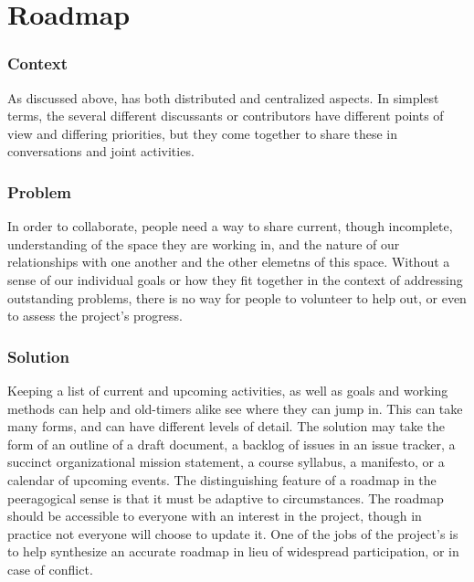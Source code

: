 \begingroup \color{OliveGreen}

\section{Roadmap} \label{sec:Roadmap}



\subsubsection*{Context} As discussed above,  has both distributed and centralized aspects. In simplest terms, the several different discussants or contributors have different points of view and differing priorities, but they come together to share these in conversations and joint activities.

\subsubsection*{Problem} In order to collaborate, people need a way to share current, though incomplete, understanding of the space they are working in, and the nature of our relationships with one another and the other elemetns of this space.  Without a sense of our individual goals or how they fit together in the context of addressing outstanding problems, there is no way for people to volunteer to help out, or even to assess the project's progress.  

\subsubsection*{Solution} Keeping a list of current and upcoming activities, as well as goals and working methods can help  and old-timers alike see where they can jump in.  This can take many forms, and can have different levels of detail.  The solution may take the form of an outline of a draft document, a backlog of issues in an issue tracker, a succinct organizational mission statement, a course syllabus, a manifesto, or a calendar of upcoming events.  The distinguishing feature of a roadmap in the peeragogical sense is that it must be adaptive to circumstances.  The roadmap should be accessible to everyone with an interest in the project, though in practice not everyone will choose to update it.  One of the jobs of the project's  is to help synthesize an accurate roadmap in lieu of widespread participation, or in case of conflict.


